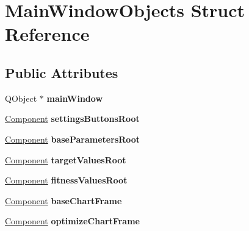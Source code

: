 \hypertarget{struct_main_window_objects}{}\section{Main\+Window\+Objects Struct Reference}
\label{struct_main_window_objects}
\subsection*{Public Attributes}
\begin{DoxyCompactItemize}
\item 
\hypertarget{struct_main_window_objects_ab6864383c5a6b6b5e2bf103d95ed36ce}{}\label{struct_main_window_objects_ab6864383c5a6b6b5e2bf103d95ed36ce} 
Q\+Object $\ast$ {\bfseries main\+Window}
\item 
\hypertarget{struct_main_window_objects_a005329df1cbb43b6a5efada959b08109}{}\label{struct_main_window_objects_a005329df1cbb43b6a5efada959b08109} 
\hyperlink{struct_component}{Component} {\bfseries settings\+Buttons\+Root}
\item 
\hypertarget{struct_main_window_objects_abdfa7ef5b54f46708493aa75bc8857b8}{}\label{struct_main_window_objects_abdfa7ef5b54f46708493aa75bc8857b8} 
\hyperlink{struct_component}{Component} {\bfseries base\+Parameters\+Root}
\item 
\hypertarget{struct_main_window_objects_a1c9dfd930602bbe606b2c9e23eaf1e7a}{}\label{struct_main_window_objects_a1c9dfd930602bbe606b2c9e23eaf1e7a} 
\hyperlink{struct_component}{Component} {\bfseries target\+Values\+Root}
\item 
\hypertarget{struct_main_window_objects_a9baa2379c0784fa902c370c22364d53a}{}\label{struct_main_window_objects_a9baa2379c0784fa902c370c22364d53a} 
\hyperlink{struct_component}{Component} {\bfseries fitness\+Values\+Root}
\item 
\hypertarget{struct_main_window_objects_a7377475ac90b86521112633e35a7455d}{}\label{struct_main_window_objects_a7377475ac90b86521112633e35a7455d} 
\hyperlink{struct_component}{Component} {\bfseries base\+Chart\+Frame}
\item 
\hypertarget{struct_main_window_objects_a327f6ab5bc103545a2bdf71af2709bb1}{}\label{struct_main_window_objects_a327f6ab5bc103545a2bdf71af2709bb1} 
\hyperlink{struct_component}{Component} {\bfseries optimize\+Chart\+Frame}
\item 
\hypertarget{struct_main_window_objects_a641ea5e0d975030e97f61e691754688d}{}\label{struct_main_window_objects_a641ea5e0d975030e97f61e691754688d} 

\end{DoxyCompactItemize}
